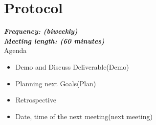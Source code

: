 \documentclass{scrartcl}
\begin{document}
\printbibliography[heading=bibintoc]


\pagebreak









  	
  
  	

  	
  	
  	
  
  	
  	
  	
  
  	
  	
  
  	


  	





	
	
	




 









 

 























                      
        
    


   

   
    
   
  

\section{Protocol}
\textbf{\textit{Frequency: (biweekly) \\
Meeting length: (60 minutes)}}\\

Agenda

\begin{itemize}
  	\item Demo and Discuss Deliverable(Demo)
  	\item Planning next Goals(Plan)
  	\item Retrospective
  	\item Date, time of the next meeting(next meeting)
 \end{itemize} 	
\end{document}
